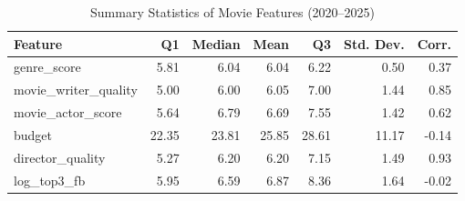 \begin{table}
\caption{Summary Statistics of Movie Features (2020–2025)}
\label{tab:movie_features_stats}
\begin{tabular}{lrrrrrr}
\toprule
Feature & Q1 & Median & Mean & Q3 & Std. Dev. & Corr. \\
\midrule
genre\_score & 5.81 & 6.04 & 6.04 & 6.22 & 0.50 & 0.37 \\
movie\_writer\_quality & 5.00 & 6.00 & 6.05 & 7.00 & 1.44 & 0.85 \\
movie\_actor\_score & 5.64 & 6.79 & 6.69 & 7.55 & 1.42 & 0.62 \\
budget & 22.35 & 23.81 & 25.85 & 28.61 & 11.17 & -0.14 \\
director\_quality & 5.27 & 6.20 & 6.20 & 7.15 & 1.49 & 0.93 \\
log\_top3\_fb & 5.95 & 6.59 & 6.87 & 8.36 & 1.64 & -0.02 \\
\bottomrule
\end{tabular}
\end{table}
